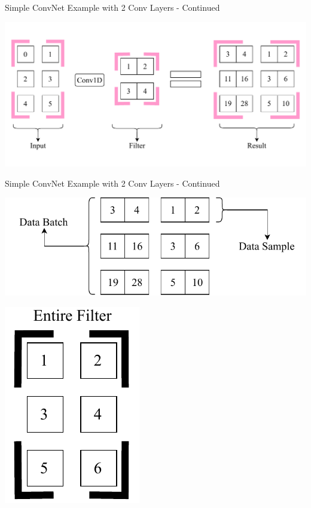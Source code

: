 \documentclass{beamer}
\begin{document}
		\begin{frame}{Simple ConvNet Example with 2 Conv Layers - Continued}
			\begin{center}
				\includegraphics[height=0.6\textheight]{firstConvSample_final}
			\end{center}
		\end{frame}
		\begin{frame}{Simple ConvNet Example with 2 Conv Layers - Continued}
			\begin{center}
				\includegraphics[height=0.4\textheight]{secondinput_final}
			\end{center}
			\begin{center}
				\includegraphics[height=0.4\textheight]{filter2}
			\end{center}
		\end{frame}
\end{document}
